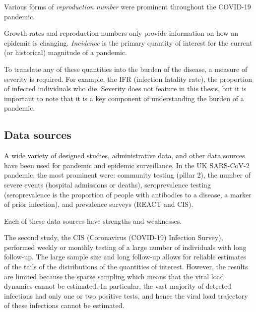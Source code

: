 \documentclass[thesis.tex]{subfiles}
\begin{document}
Various forms of \emph{reproduction number} were prominent throughout the COVID-19 pandemic.


Growth rates and reproduction numbers only provide information on how an epidemic is changing.
\emph{Incidence} is the primary quantity of interest for the current (or historical) magnitude of a pandemic.



To translate any of these quantities into the burden of the disease, a measure of severity is required.
For example, the IFR (infection fatality rate), the proportion of infected individuals who die.
Severity does not feature in this thesis, but it is important to note that it is a key component of understanding the burden of a pandemic.

\subsection{Data sources}

A wide variety of designed studies, administrative data, and other data sources have been used for pandemic and epidemic surveillance.
In the UK SARS-CoV-2 pandemic, the most prominent were: community testing (pillar 2), the number of severe events (\eg hospital admissions or deaths), seroprevalence testing (seroprevalence is the proportion of people with antibodies to a disease, a marker of prior infection), and prevalence surveys (\eg REACT and CIS).

Each of these data sources have strengths and weaknesses.

The second study, the CIS (Coronavirus (COVID-19) Infection Survey), performed weekly or monthly testing of a large number of individuals with long follow-up.
The large sample size and long follow-up allows for reliable estimates of the tails of the distributions of the quantities of interest.
However, the results are limited because the sparse sampling which means that the viral load dynamics cannot be estimated.
In particular, the vast majority of detected infections had only one or two positive tests, and hence the viral load trajectory of these infections cannot be estimated.
\end{document}
